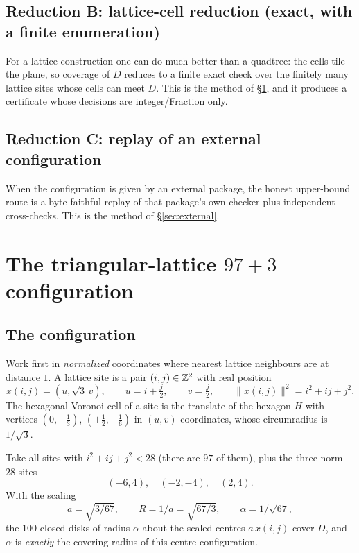 \subsection{Reduction B: lattice-cell reduction (exact, with a finite enumeration)}

For a lattice construction one can do much better than a quadtree: the cells tile the plane, so
coverage of $D$ reduces to a finite exact check over the finitely many lattice sites whose cells
can meet $D$. This is the method of \S\ref{sec:lattice}, and it produces a certificate whose
decisions are integer/Fraction only.

\subsection{Reduction C: replay of an external configuration}

When the configuration is given by an external package, the honest upper-bound route is a
byte-faithful replay of that package's own checker plus independent cross-checks. This is the
method of \S\ref{sec:external}.

\section{The triangular-lattice $97{+}3$ configuration}
\label{sec:lattice}

\subsection{The configuration}

Work first in \emph{normalized} coordinates where nearest lattice neighbours are at distance $1$.
A lattice site is a pair $(i,j)\in\mathbb{Z}^2$ with real position
\[
x(i,j)=(u,\sqrt3\,v),\qquad u=i+\tfrac j2,\qquad v=\tfrac j2,
\qquad
\|x(i,j)\|^2=i^2+ij+j^2 .
\]
The hexagonal Voronoi cell of a site is the translate of the hexagon $H$ with vertices
$(0,\pm\frac13)$, $(\pm\frac12,\pm\frac16)$ in $(u,v)$ coordinates, whose circumradius is
$1/\sqrt3$.

\begin{construction}\label{con:lattice}
Take all sites with $i^2+ij+j^2<28$ (there are $97$ of them), plus the three norm-$28$ sites
\[
(-6,4),\quad(-2,-4),\quad(2,4).
\]
With the scaling
\[
a=\sqrt{3/67},\qquad R=1/a=\sqrt{67/3},\qquad \alpha=1/\sqrt{67},
\]
the $100$ closed disks of radius $\alpha$ about the scaled centres $a\,x(i,j)$ cover $D$, and
$\alpha$ is \emph{exactly} the covering radius of this centre configuration.
\end{construction}

